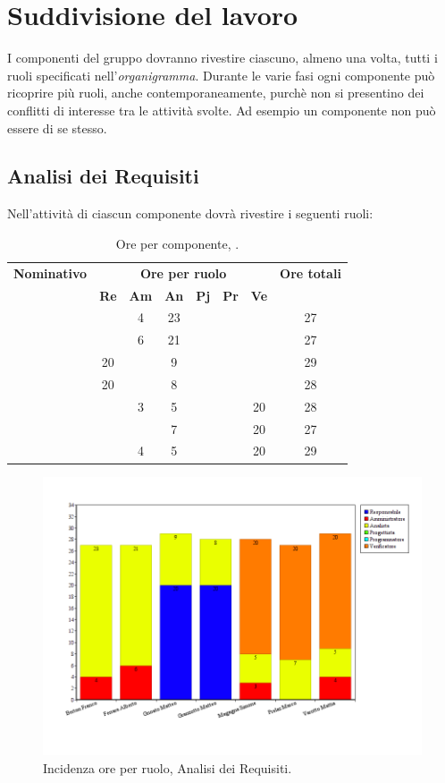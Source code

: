 \section{Suddivisione del lavoro}
I componenti del gruppo dovranno rivestire ciascuno, almeno una volta, tutti i ruoli specificati nell'\textit{organigramma}.
Durante le varie fasi ogni componente può ricoprire più ruoli, anche contemporaneamente, purchè non si presentino dei conflitti di interesse tra le attività svolte. Ad esempio un componente non può essere \textit{\Ver} di se stesso.
\subsection{Analisi dei Requisiti}
Nell'attività di \textit{\AdR} ciascun componente dovrà rivestire i seguenti ruoli:
\begin{table}[H]
	\begin{center}
		\begin{tabular}{|c|c|c|c|c|c|c|c|}
			\hline
			\textbf{Nominativo} & \multicolumn{6}{c|}{\textbf{Ore per ruolo}} & \textbf{Ore totali} \\
			& \textbf{Re} & \textbf{Am} & \textbf{An} & \textbf{Pj} & \textbf{Pr} & \textbf{Ve} & \\
			\hline
			\FB	&		&	4	&	23	&		&		&		&	27	\\
			\hline
			\AF		&		&	6	&	21	&	 	&		&		& 	27	\\
			\hline
			\GN		&	20	&		&	9	&		&		&		&	29	\\
			\hline						
			\GR	&	20	&	 	&	8 	&		&	 	& 		&	28	\\
			\hline
			\SM 		&		&	3	&	5	&		&		& 	20	&	28	\\
			\hline
			\MP		& 		&		&	7	&		&		&	20	&	27	\\
			\hline						
			\MV 		&		&	4	&	5	&		&		&	20	& 	29	\\
			\hline
		\end{tabular}
	\end{center}
	\caption{Ore per componente, \AdR.}
\end{table}

\begin{figure}[H]
	\centering
	\includegraphics[scale=0.4]{immagini/Grafi/GrafoAR}
	\caption{Incidenza ore per ruolo, Analisi dei Requisiti.}
\end{figure}

